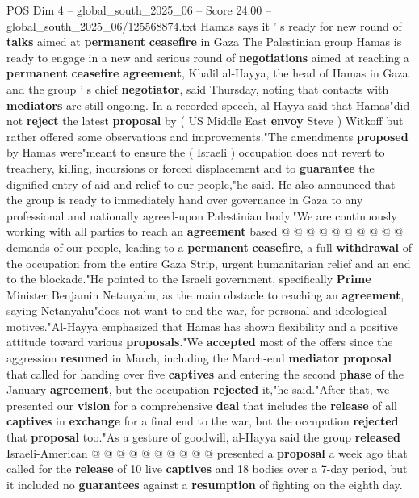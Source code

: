 \begin{textsample}{POS Dim 4 – global\_south\_2025\_06 – Score 24.00 – global\_south\_2025\_06/125568874.txt}  \label{ex:f4_pos_351}
Hamas says it ' s ready for new round of \textbf{talks} aimed at \textbf{permanent} \textbf{ceasefire} in Gaza The Palestinian group Hamas is ready to engage in a new and serious round of \textbf{negotiations} aimed at reaching a \textbf{permanent} \textbf{ceasefire} \textbf{agreement}, Khalil al-Hayya, the head of Hamas in Gaza and the group ' s chief \textbf{negotiator}, said Thursday, noting that contacts with \textbf{mediators} are still ongoing.
In a recorded speech, al-Hayya said that Hamas"did not \textbf{reject} the latest \textbf{proposal} by ( US Middle East \textbf{envoy} Steve ) Witkoff but rather offered some observations and improvements."The amendments \textbf{proposed} by Hamas were"meant to ensure the ( Israeli ) occupation does not revert to treachery, killing, incursions or forced displacement and to \textbf{guarantee} the dignified entry of aid and relief to our people,"he said.
He also announced that the group is ready to immediately hand over governance in Gaza to any professional and nationally agreed-upon Palestinian body."We are continuously working with all parties to reach an \textbf{agreement} based @ @ @ @ @ @ @ @ @ @ demands of our people, leading to a \textbf{permanent} \textbf{ceasefire}, a full \textbf{withdrawal} of the occupation from the entire Gaza Strip, urgent humanitarian relief and an end to the blockade."He pointed to the Israeli government, specifically \textbf{Prime} Minister Benjamin Netanyahu, as the main obstacle to reaching an \textbf{agreement}, saying Netanyahu"does not want to end the war, for personal and ideological motives."Al-Hayya emphasized that Hamas has shown flexibility and a positive attitude toward various \textbf{proposals}."We \textbf{accepted} most of the offers since the aggression \textbf{resumed} in March, including the March-end \textbf{mediator} \textbf{proposal} that called for handing over five \textbf{captives} and entering the second \textbf{phase} of the January \textbf{agreement}, but the occupation \textbf{rejected} it,"he said."After that, we presented our \textbf{vision} for a comprehensive \textbf{deal} that includes the \textbf{release} of all \textbf{captives} in \textbf{exchange} for a final end to the war, but the occupation \textbf{rejected} that \textbf{proposal} too."As a gesture of goodwill, al-Hayya said the group \textbf{released} Israeli-American @ @ @ @ @ @ @ @ @ @ presented a \textbf{proposal} a week ago that called for the \textbf{release} of 10 live \textbf{captives} and 18 bodies over a 7-day period, but it included no \textbf{guarantees} against a \textbf{resumption} of fighting on the eighth day.

\end{textsample}
